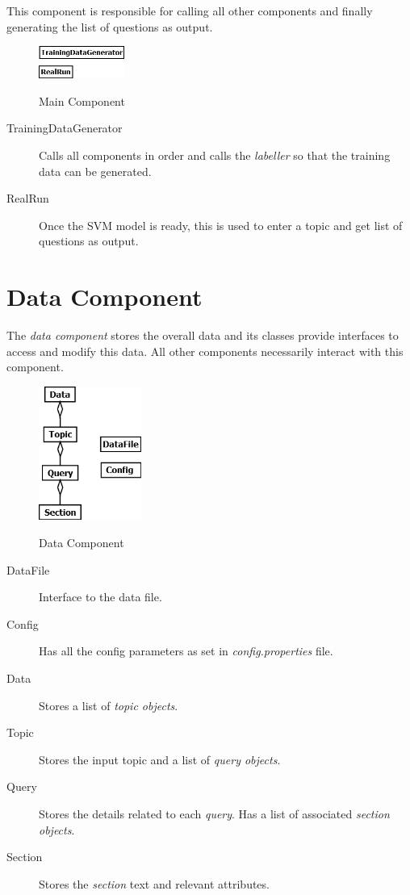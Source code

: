 \documentclass[a4paper,10pt]{report}
\begin{document}
This component is responsible for calling all other components and finally generating the list of questions as output. \\

\begin{figure}[h!]
\centering
\includegraphics[width=0.25\textwidth]{./diagrams/Main}\\
\caption{Main Component}
\end{figure}

\begin{description}
	\item[TrainingDataGenerator] Calls all components in order and calls the \emph{labeller} so that the training data can be generated.
	\item[RealRun] Once the SVM model is ready, this is used to enter a topic and get list of questions as output.
\end{description}


\section{Data Component}

The \emph{data component} stores the overall data and its classes provide interfaces to access and modify this data. All other components necessarily interact with this component. \\

\begin{figure}[h!]
\centering
\includegraphics[width=0.30\textwidth]{./diagrams/Data}\\
\caption{Data Component}
\end{figure}

\begin{description}
	\item[DataFile] Interface to the data file.
	\item[Config] Has all the config parameters as set in \emph{config.properties} file.
    \item[Data] Stores a list of \emph{topic objects}.
    \item[Topic] Stores the input topic and a list of \emph{query objects}.
	\item[Query] Stores the details related to each \emph{query}. Has a list of associated \emph{section objects}.
	\item[Section] Stores the \emph{section} text and relevant attributes.
\end{description}
\end{document}

